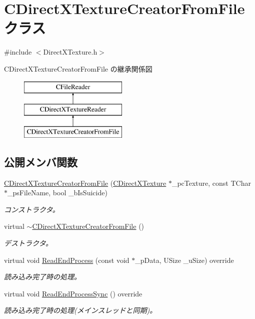 \hypertarget{class_c_direct_x_texture_creator_from_file}{}\section{C\+Direct\+X\+Texture\+Creator\+From\+File クラス}
\label{class_c_direct_x_texture_creator_from_file}


{\ttfamily \#include $<$Direct\+X\+Texture.\+h$>$}

C\+Direct\+X\+Texture\+Creator\+From\+File の継承関係図\begin{figure}[H]
\begin{center}
\leavevmode
\includegraphics[height=3.000000cm]{class_c_direct_x_texture_creator_from_file}
\end{center}
\end{figure}
\subsection*{公開メンバ関数}
\begin{DoxyCompactItemize}
\item 
\hyperlink{class_c_direct_x_texture_creator_from_file_abc0c74b93240a98b4b12a59bbf343aee}{C\+Direct\+X\+Texture\+Creator\+From\+File} (\hyperlink{class_c_direct_x_texture}{C\+Direct\+X\+Texture} $\ast$\+\_\+pc\+Texture, const T\+Char $\ast$\+\_\+ps\+File\+Name, bool \+\_\+b\+Is\+Suicide)
\begin{DoxyCompactList}\small\item\em コンストラクタ。 \end{DoxyCompactList}\item 
virtual \hyperlink{class_c_direct_x_texture_creator_from_file_af8fccf4bb049bcbe98cd8af63e5bc6dd}{$\sim$\+C\+Direct\+X\+Texture\+Creator\+From\+File} ()
\begin{DoxyCompactList}\small\item\em デストラクタ。 \end{DoxyCompactList}\item 
virtual void \hyperlink{class_c_direct_x_texture_creator_from_file_a5358c62c1a9b7154b17e64d480fa140c}{Read\+End\+Process} (const void $\ast$\+\_\+p\+Data, U\+Size \+\_\+u\+Size) override
\begin{DoxyCompactList}\small\item\em 読み込み完了時の処理。 \end{DoxyCompactList}\item 
virtual void \hyperlink{class_c_direct_x_texture_creator_from_file_aff2a72e9d40761f7654e3b37d6c0b0dd}{Read\+End\+Process\+Sync} () override
\begin{DoxyCompactList}\small\item\em 読み込み完了時の処理(メインスレッドと同期)。 \end{DoxyCompactList}\end{DoxyCompactItemize}
